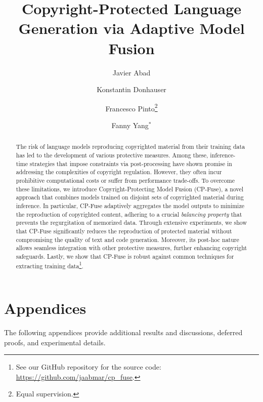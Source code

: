 \documentclass{article} %
\author[1]{Javier Abad}
\author[1]{Konstantin Donhauser}
\author[2]{Francesco Pinto\footnote{Equal supervision.}}
\author[1]{Fanny Yang$^*$}
\affil[1]{Department of Computer Science, ETH Zürich}
\affil[2]{Department of Engineering Science, University of Oxford}
\title{Copyright-Protected Language Generation via Adaptive Model Fusion}
\date{}
\newcommand\DoToC{%
  \startcontents
\hypersetup{}
  \printcontents{}{1}{\subsection*{\textbf{Table of contents}}}
  \vskip3pt\vskip5pt
}
\begin{document}
\maketitle
 
\begin{abstract}
The risk of language models reproducing copyrighted material from their training data has led to the development of various protective measures. Among these, inference-time strategies that impose constraints via post-processing have shown promise in addressing the complexities of copyright regulation. However, they often incur prohibitive computational costs or suffer from performance trade-offs. To overcome these limitations, we introduce Copyright-Protecting Model Fusion (CP-Fuse), a novel approach that combines models trained on disjoint sets of copyrighted material during inference. In particular, CP-Fuse adaptively aggregates the model outputs to minimize the reproduction of copyrighted content, adhering to a crucial \textit{balancing property} that prevents the regurgitation of memorized data. Through extensive experiments, we show that CP-Fuse significantly reduces the reproduction of protected material without compromising the quality of text and code generation. Moreover, its post-hoc nature allows seamless integration with other protective measures, further enhancing copyright safeguards. Lastly, we show that CP-Fuse is robust against common techniques for extracting training data\footnote{See our GitHub repository for the source code: \url{https://github.com/jaabmar/cp_fuse}.}.


\end{abstract}










\clearpage
\DoToC
\appendix
\onecolumn
\section*{Appendices}
The following appendices provide additional results and discussions, deferred proofs, and experimental details.
\FloatBarrier

\end{document}
